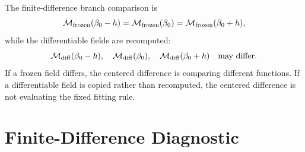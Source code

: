 \documentclass[11pt]{article}
\numberwithin{equation}{section}
\begin{document}
The finite-difference branch comparison is
\begin{equation}
    \mathcal M_{\rm frozen}(\beta_0-h)
    =
    \mathcal M_{\rm frozen}(\beta_0)
    =
    \mathcal M_{\rm frozen}(\beta_0+h),
    \label{eq:p24-p23-man6}
\end{equation}
while the differentiable fields are recomputed:
\begin{equation}
    \mathcal M_{\rm diff}(\beta_0-h),
    \quad
    \mathcal M_{\rm diff}(\beta_0),
    \quad
    \mathcal M_{\rm diff}(\beta_0+h)
    \quad
    \text{may differ.}
    \label{eq:p24-p23-man7}
\end{equation}
If a frozen field differs, the centered difference is comparing different
functions.  If a differentiable field is copied rather than recomputed, the
centered difference is not evaluating the fixed fitting rule.

\section{Finite-Difference Diagnostic}
\end{document}
